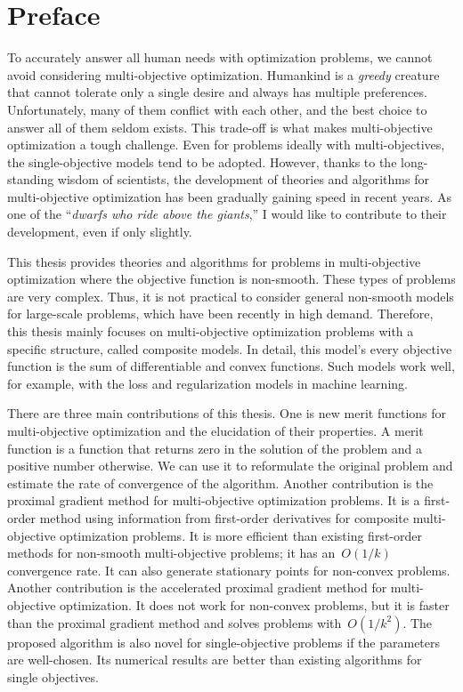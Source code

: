 \documentclass[../main]{subfiles}
\begin{document}
\chapter*{Preface}
To accurately answer all human needs with optimization problems, we cannot avoid considering multi-objective optimization.
Humankind is a \emph{greedy} creature that cannot tolerate only a single desire and always has multiple preferences.
Unfortunately, many of them conflict with each other, and the best choice to answer all of them seldom exists. This trade-off is what makes multi-objective optimization a tough challenge.
Even for problems ideally with multi-objectives, the single-objective models tend to be adopted.
However, thanks to the long-standing wisdom of scientists, the development of theories and algorithms for multi-objective optimization has been gradually gaining speed in recent years.
As one of the ``\emph{dwarfs who ride above the giants},'' I would like to contribute to their development, even if only slightly.

This thesis provides theories and algorithms for problems in multi-objective optimization where the objective function is non-smooth. These types of problems are very complex.
Thus, it is not practical to consider general non-smooth models for large-scale problems, which have been recently in high demand.
Therefore, this thesis mainly focuses on multi-objective optimization problems with a specific structure, called composite models.
In detail, this model's every objective function is the sum of differentiable and convex functions.
Such models work well, for example, with the loss and regularization models in machine learning.

There are three main contributions of this thesis.
One is new merit functions for multi-objective optimization and the elucidation of their properties.
A merit function is a function that returns zero in the solution of the problem and a positive number otherwise.
We can use it to reformulate the original problem and estimate the rate of convergence of the algorithm.
Another contribution is the proximal gradient method for multi-objective optimization problems.
It is a first-order method using information from first-order derivatives for composite multi-objective optimization problems.
It is more efficient than existing first-order methods for non-smooth multi-objective problems; it has an~$O(1/k)$ convergence rate.
It can also generate stationary points for non-convex problems. Another contribution is the accelerated proximal gradient method for multi-objective optimization.
It does not work for non-convex problems, but it is faster than the proximal gradient method and solves problems with~$O(1/k^2)$.
The proposed algorithm is also novel for single-objective problems if the parameters are well-chosen.
Its numerical results are better than existing algorithms for single objectives.

\begin{flushright}
\TheAuthor \\
\TheDate
\end{flushright}
\end{document}

